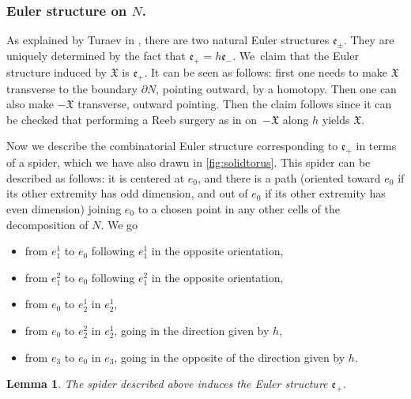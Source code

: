 \documentclass[JEP,XML,SOM,Unicode,NoFloatCountersInSection,published]{cedram}
\theoremstyle{plain}
\newtheorem{lem}[thm]{Lemma}
\theoremstyle{definition}
\theoremstyle{remark}
\numberwithin{equation}{section}
\begin{document}
\subsubsection*{Euler structure on $N$.}
As explained by Turaev in \cite[\S VI.2.4]{Turaev_tors}, there are two natural Euler structures $\mathfrak e_{\pm}$. They are uniquely determined by the fact that $\mathfrak e_+ = h \mathfrak e_-$. We~claim that the Euler structure induced by $\mathfrak X$ is $\mathfrak e_+$. It can be seen as follows: first one needs to make $\mathfrak X$ transverse to the boundary $\partial N$, pointing outward, by a homotopy. Then one can also make $-\mathfrak X$ transverse, outward pointing. Then the claim follows since it can be checked that performing a Reeb surgery as in \cite[\S I.4.2]{Turaev_tors} on~$- \mathfrak X$ along $h$ yields $\mathfrak X$.

Now we describe the combinatorial Euler structure corresponding to $\mathfrak e_+$ in terms of a spider, which we have also drawn in \cref{fig:solidtorus}. This spider can be described as follows: it is centered at $e_0$, and there is a path (oriented toward $e_0$ if its other extremity has odd dimension, and out of $e_0$ if its other extremity has even dimension) joining $e_0$ to a chosen point in any other cells of the decomposition of $N$. We go
\begin{itemize}
\item from $e_1^1$ to $e_0$ following $e_1^1$ in the opposite orientation,
\item from $e_1^2$ to $e_0$ following $e_1^2$ in the opposite orientation,
\item from $e_0$ to $e_2^1$ in $e_2^1$,
\item from $e_0$ to $e_2^2$ in $e_2^1$, going in the direction given by $h$,
\item from $e_3$ to $e_0$ in $e_3$, going in the opposite of the direction given by $h$.
\end{itemize}

\begin{lem}
\label{lem:spid}
The spider described above induces the Euler structure $\mathfrak e_+$.
\end{lem}
\end{document}
